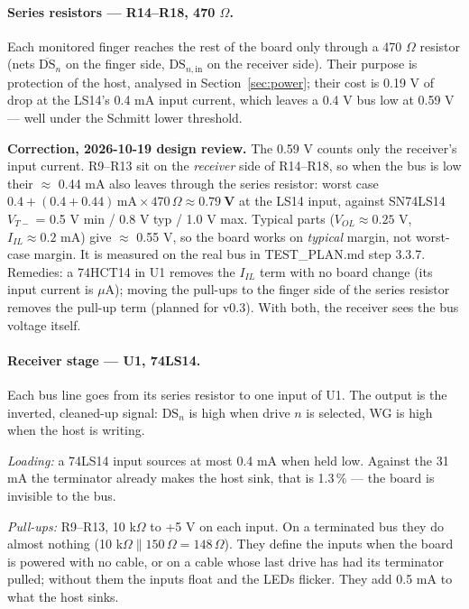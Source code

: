 \documentclass[11pt,a4paper]{article}
\newcommand{\nb}[1]{\overline{\mathrm{#1}}}      %
\begin{document}
\paragraph{Series resistors --- R14--R18, 470 $\Omega$.}
Each monitored finger reaches the rest of the board only through a 470 $\Omega$ resistor (nets
$\nb{DS}_n$ on the finger side, $\mathrm{DS}_{n,\mathrm{in}}$ on the receiver side). Their purpose is
protection of the host, analysed in Section~\ref{sec:power}; their cost is 0.19 V of drop at the LS14's
0.4 mA input current, which leaves a 0.4 V bus low at 0.59 V --- well under the Schmitt lower threshold.

\textcolor{red!70!black}{\textbf{Correction, 2026-10-19 design review.} The 0.59 V counts only the receiver's input current. R9--R13
sit on the \emph{receiver} side of R14--R18, so when the bus is low their $\approx$ 0.44 mA also leaves through the
series resistor: worst case $0.4 + (0.4 + 0.44)\,\mathrm{mA} \times 470\,\Omega \approx \mathbf{0.79\ V}$ at the LS14
input, against SN74LS14 $V_{T-}$ = 0.5 V min / 0.8 V typ / 1.0 V max. Typical parts ($V_{OL} \approx 0.25$ V,
$I_{IL} \approx 0.2$ mA) give $\approx$ 0.55 V, so the board works on \emph{typical} margin, not worst-case margin.
It is measured on the real bus in TEST\_PLAN.md step 3.3.7. Remedies: a 74HCT14 in U1 removes the $I_{IL}$ term with
no board change (its input current is $\mu$A); moving the pull-ups to the finger side of the series resistor removes
the pull-up term (planned for v0.3). With both, the receiver sees the bus voltage itself.}

\paragraph{Receiver stage --- U1, 74LS14.}
Each bus line goes from its series resistor to one input of U1. The output is the inverted, cleaned-up signal:
$\mathrm{DS}_n$ is high when drive $n$ is selected, WG is high when the host is writing.

\emph{Loading:} a 74LS14 input sources at most 0.4 mA when held low. Against the 31 mA the terminator already
makes the host sink, that is 1.3\,\% --- the board is invisible to the bus.

\emph{Pull-ups:} R9--R13, 10 k$\Omega$ to +5 V on each input. On a terminated bus they do almost nothing
(10 k$\Omega \parallel 150\,\Omega = 148\,\Omega$). They define the inputs when the board is powered with no
cable, or on a cable whose last drive has had its terminator pulled; without them the inputs float and the
LEDs flicker. They add 0.5 mA to what the host sinks.
\end{document}
